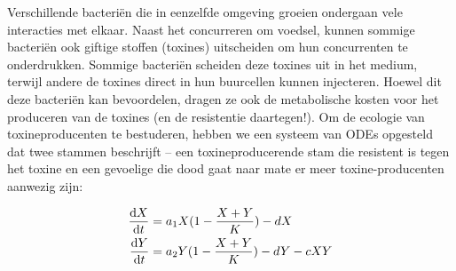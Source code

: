 \documentclass[
  a4paper,
]{scrbook}
\theoremstyle{definition}
\theoremstyle{remark}
\begin{document}
\begin{tcolorbox}[enhanced jigsaw, coltitle=black, breakable, bottomtitle=1mm, opacityback=0, colback=white, rightrule=.15mm, title=\textcolor{quarto-callout-caution-color}{\faFire}\hspace{0.5em}{Computerpracticum over toxine-productie}, bottomrule=.15mm, toprule=.15mm, left=2mm, colframe=quarto-callout-caution-color-frame, toptitle=1mm, opacitybacktitle=0.6, titlerule=0mm, colbacktitle=quarto-callout-caution-color!10!white, leftrule=.75mm, arc=.35mm]

Verschillende bacteriën die in eenzelfde omgeving groeien ondergaan vele
interacties met elkaar. Naast het concurreren om voedsel, kunnen sommige
bacteriën ook giftige stoffen (toxines) uitscheiden om hun concurrenten
te onderdrukken. Sommige bacteriën scheiden deze toxines uit in het
medium, terwijl andere de toxines direct in hun buurcellen kunnen
injecteren. Hoewel dit deze bacteriën kan bevoordelen, dragen ze ook de
metabolische kosten voor het produceren van de toxines (en de
resistentie daartegen!). Om de ecologie van toxineproducenten te
bestuderen, hebben we een systeem van ODEs opgesteld dat twee stammen
beschrijft -- een toxineproducerende stam die resistent is tegen het
toxine en een gevoelige die dood gaat naar mate er meer
toxine-producenten aanwezig zijn:

\begin{align}
\mathchoice{\frac{\mathrm{d}X}
{\mathrm{d}t}}{\mathrm{d}X/\mathrm{d}t}
{\mathrm{d}X/\mathrm{d}t}
{\mathrm{d}X/\mathrm{d}t} &= a_{1}X(1-\frac{X+Y}{K}) - dX \\
\mathchoice{\frac{\mathrm{d}Y}
{\mathrm{d}t}}{\mathrm{d}Y/\mathrm{d}t}
{\mathrm{d}Y/\mathrm{d}t}
{\mathrm{d}Y/\mathrm{d}t} &= a_{2}Y(1-\frac{X+Y}{K}) - dY - cXY
\end{align}


\end{tcolorbox}
\end{document}
